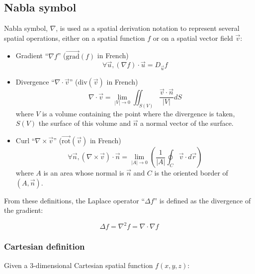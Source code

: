 \documentclass[a4paper,10pt]{article}
\begin{document}
\subsection{Nabla symbol}

Nabla symbol, $\nabla$, is used as a spatial derivation notation to represent several spatial operations, either on a spatial function $f$ or on a spatial vector field $\vec{v}$:

\begin{itemize}
  \item Gradient ``$\nabla f$'' ($\vec{\text{grad}}\left(f\right)$ in French)
     \begin{equation}
       \forall \vec{u}, \left(\nabla f\right) \cdot \vec{u} = D_{\vec{u}} f
     \end{equation}
  \item Divergence ``$\nabla \cdot \vec{v}$'' ($\text{div}\left(\vec{v}\right)$ in French)
     \begin{equation}
       \nabla \cdot \vec{v} = \lim_{|V| \to 0} \iint_{S(V)} \frac{\vec{v} \cdot \vec{n}}{|V|} dS
     \end{equation}
     where $V$ is a volume containing the point where the divergence is taken, $S(V)$ the surface of this volume and $\vec{n}$ a normal vector of the surface.
  \item Curl ``$\nabla \times \vec{v}$'' ($\vec{\text{rot}}\left(\vec{v}\right)$ in French)
     \begin{equation}
       \forall \vec{n},
       \left(\nabla \times \vec{v}\right) \cdot \vec{n} = \lim_{|A| \to 0}\left( \frac{1}{|A|}\oint_{C} \vec{v} \cdot d\vec{r}\right)
     \end{equation}
     where $A$ is an area whose normal is $\vec{n}$ and $C$ is the oriented border of $(A, \vec{n})$.
\end{itemize}

From these definitions, the Laplace operator ``$\Delta f$'' is defined as the divergence of the gradient:

\begin{equation}
  \Delta f = \nabla^2 f = \nabla \cdot \nabla f
\end{equation}

\subsubsection{Cartesian definition}

Given a 3-dimensional Cartesian spatial function $f(x, y, z)$:
\end{document}
